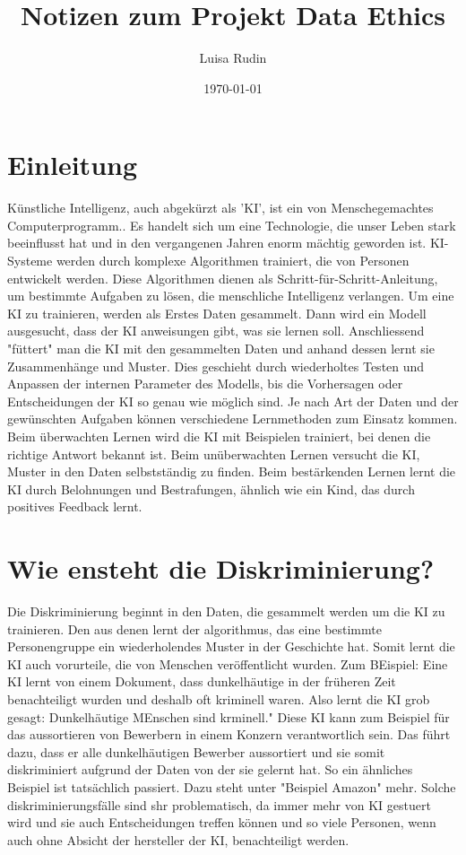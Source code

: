 \documentclass{article}
\title{Notizen zum Projekt Data Ethics}
\author{Luisa Rudin}
\date{\today}
\begin{document}
\maketitle


\tableofcontents

\section{Einleitung}
Künstliche Intelligenz, auch abgekürzt als 'KI', ist ein von Menschegemachtes Computerprogramm.. Es handelt sich um eine Technologie, die unser Leben stark beeinflusst hat und in den vergangenen Jahren enorm mächtig geworden ist. KI-Systeme werden durch komplexe Algorithmen trainiert, die von Personen entwickelt werden. Diese Algorithmen dienen als Schritt-für-Schritt-Anleitung, um bestimmte Aufgaben zu lösen, die menschliche Intelligenz verlangen.  Um eine KI zu trainieren, werden als Erstes Daten gesammelt. Dann wird ein Modell ausgesucht, dass der KI anweisungen gibt, was sie lernen soll. Anschliessend "füttert" man die KI mit den gesammelten Daten und anhand dessen lernt sie Zusammenhänge und Muster. Dies geschieht durch wiederholtes Testen und Anpassen der internen Parameter des Modells, bis die Vorhersagen oder Entscheidungen der KI so genau wie möglich sind. Je nach Art der Daten und der gewünschten Aufgaben können verschiedene Lernmethoden zum Einsatz kommen. Beim überwachten Lernen wird die KI mit Beispielen trainiert, bei denen die richtige Antwort bekannt ist. Beim unüberwachten Lernen versucht die KI, Muster in den Daten selbstständig zu finden. Beim bestärkenden Lernen lernt die KI durch Belohnungen und Bestrafungen, ähnlich wie ein Kind, das durch positives Feedback lernt.



\section{Wie ensteht die Diskriminierung?}
Die Diskriminierung beginnt in den Daten, die gesammelt werden um die KI zu trainieren. Den aus denen lernt der algorithmus, das eine bestimmte Personengruppe ein wiederholendes Muster in der Geschichte hat. Somit lernt die KI auch vorurteile, die von Menschen veröffentlicht wurden. Zum BEispiel: Eine KI lernt von einem Dokument, dass dunkelhäutige in der früheren Zeit benachteiligt wurden und deshalb oft kriminell waren. Also lernt die KI grob gesagt: Dunkelhäutige MEnschen sind krminell." Diese KI kann zum Beispiel für das aussortieren von Bewerbern in einem Konzern verantwortlich sein. Das führt dazu, dass er alle dunkelhäutigen Bewerber aussortiert und sie somit diskriminiert aufgrund der Daten von der sie gelernt hat. So ein ähnliches Beispiel ist tatsächlich passiert. Dazu steht unter "Beispiel Amazon" mehr. Solche diskriminierungsfälle sind shr problematisch, da immer mehr von KI gestuert wird und sie auch Entscheidungen treffen können und so viele Personen, wenn auch ohne Absicht der hersteller der KI, benachteiligt werden. 
\end{document}
